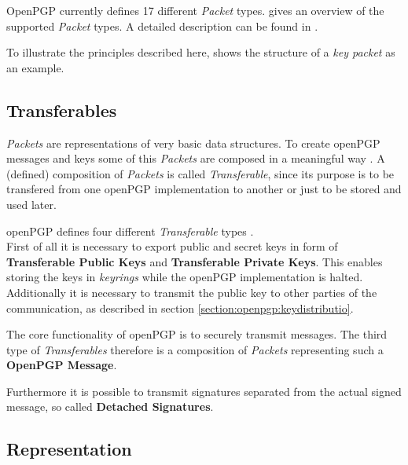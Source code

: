 OpenPGP currently defines 17 different \textit{Packet} types.  gives an overview of the supported \textit{Packet} types. A detailed description can be found in \citep[section 5]{RFC4880}.

To illustrate the principles described here, \todo{} shows the structure of a \textit{key packet} as an example.



\subsection{Transferables}

\textit{Packets} are representations of very basic data structures. To create openPGP messages and keys some of this \textit{Packets} are composed in a meaningful way \citep[section 11]{RFC4880}. A (defined) composition of \textit{Packets} is called \textit{Transferable}, since its purpose is to be transfered from one openPGP implementation to another or just to be stored and used later. 

openPGP defines four different \textit{Transferable} types \citep[section 11]{RFC4880}. \\

First of all it is necessary to export public and secret keys in form of \textbf{Transferable Public Keys} and \textbf{Transferable Private Keys}. This enables storing the keys in \textit{keyrings} while the openPGP implementation is halted.  Additionally it is necessary to transmit the public key to other parties of the communication, as described in section \ref{section:openpgp:keydistributio}. \\


The core functionality of openPGP is to securely transmit messages. The third type of \textit{Transferables} therefore is a composition of \textit{Packets} representing such a \textbf{OpenPGP Message}. \\


Furthermore it is possible to transmit signatures separated from the actual signed message, so called \textbf{Detached Signatures}.

\subsection{Representation}

